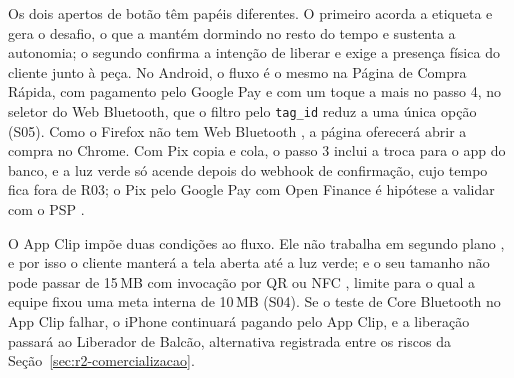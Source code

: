 Os dois apertos de botão têm papéis diferentes. O primeiro acorda a etiqueta e gera o desafio, o que a mantém dormindo no resto do tempo e sustenta a autonomia; o segundo confirma a intenção de liberar e exige a presença física do cliente junto à peça. No Android, o fluxo é o mesmo na Página de Compra Rápida, com pagamento pelo Google Pay \cite{google2026paywebvisao} e com um toque a mais no passo 4, no seletor do Web Bluetooth, que o filtro pelo \texttt{tag\_id} reduz a uma única opção (S05). Como o Firefox não tem Web Bluetooth \cite{chrome2026webbluetooth, caniuse2026webbluetooth}, a página oferecerá abrir a compra no Chrome. Com Pix copia e cola, o passo 3 inclui a troca para o app do banco, e a luz verde só acende depois do webhook de confirmação, cujo tempo fica fora de R03; o Pix pelo Google Pay com Open Finance é hipótese a validar com o PSP \cite{yuno2026googlepaypix}.

O App Clip impõe duas condições ao fluxo. Ele não trabalha em segundo plano \cite{apple2026appclipfuncoes}, e por isso o cliente manterá a tela aberta até a luz verde; e o seu tamanho não pode passar de 15\,MB com invocação por QR ou NFC \cite{apple2026tamanhos}, limite para o qual a equipe fixou uma meta interna de 10\,MB (S04). Se o teste de Core Bluetooth no App Clip falhar, o iPhone continuará pagando pelo App Clip, e a liberação passará ao Liberador de Balcão, alternativa registrada entre os riscos da Seção~\ref{sec:r2-comercializacao}.

